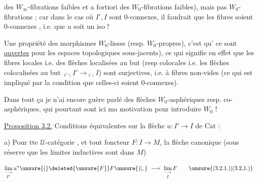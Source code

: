 
des $W_\infty$-fibrations faibles et a fortiori des $W_0$-fibrations faibles), mais pas  $W_0$-fibrations ; car dans le cas où $I',I$ sont $0$-connexes, il faudrait que les fibres soient $0$-connexes , i.e. que $u$ soit un iso !

Une propriété  des morphismes $W_0$-lisses (resp. $W_0$-propres), c'est qu' ce sont   \uline{ouvertes}  pour les espaces topologiques sous-jacents), ce qui signifie en effet que les fibres locales i.e. des flèches localisées au but  (resp colocales i.e. les flèches colocalisées au but $\,{}_{i'\backslash}I'\longrightarrow{}_{i\backslash}I$) sont surjectives, i.e. à fibres non-vides (ce qui est impliqué par la condition que celles-ci soient $0$-connexes).

Dans tout ça je n'ai  encore guère parlé des flèches $W_0$-asphériques resp. co-asphériques, qui pourtant sont ici ma motivation  pour introduire $W_0$ !

\uline{Proposition 3.2.} Conditions équivalentes sur la flèche $u:I'\longrightarrow I$ de $\mathrm{Cat}$ :

a) Pour tte $\mathcal{U}$-catégorie , et tout foncteur $F:I\longrightarrow M$, la flèche canonique (sous réserve que les   limites inductives sont  dans $M$)

\[
\underset{I'}{\underset{\longrightarrow}{\lim}}\,u^*\unsure{(}\deleted{\unsure{F}}F\unsure{)|,}\ \longrightarrow\ \underset{I}{\underset{\longrightarrow}{\lim}}\,F \tag*{\unsure{(3.2.1.)|(3.2,1.)}}
\]
